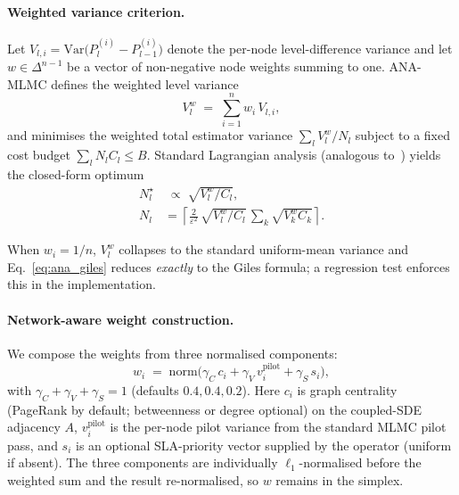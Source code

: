 \documentclass{ieeeaccess}
\begin{document}
\paragraph{Weighted variance criterion.}
Let $V_{l,i} = \mathrm{Var}\bigl(P_l^{(i)} - P_{l-1}^{(i)}\bigr)$ denote the per-node
level-difference variance and let $w \in \Delta^{n-1}$ be a vector of non-negative node weights
summing to one. ANA-MLMC defines the weighted level variance
\begin{equation}
    V_l^{w} \;=\; \sum_{i=1}^{n} w_i\, V_{l,i},
    \label{eq:ana_var}
\end{equation}
and minimises the weighted total estimator variance $\sum_l V_l^{w}/N_l$ subject to a fixed cost
budget $\sum_l N_l C_l \le B$. Standard Lagrangian analysis (analogous
to~\cite{giles2015multilevel}) yields the closed-form optimum
\begin{align}
    N_l^{\star} &\;\propto\; \sqrt{V_l^{w}/C_l}, \nonumber \\
    N_l &= \left\lceil \tfrac{2}{\varepsilon^{2}}\,
    \sqrt{V_l^{w}/C_l}\, \sum_k \sqrt{V_k^{w} C_k} \right\rceil .
    \label{eq:ana_giles}
\end{align}
\begin{sloppypar}
When $w_i = 1/n$, $V_l^{w}$ collapses to the standard uniform-mean variance and
Eq.~\eqref{eq:ana_giles} reduces \emph{exactly} to the Giles formula; a regression test
enforces this in the implementation.
\end{sloppypar}

\paragraph{Network-aware weight construction.}
We compose the weights from three normalised components:
\begin{equation}
    w_i \;=\; \mathrm{norm}\bigl(\gamma_C\, c_i
                + \gamma_V\, v_i^{\text{pilot}}
                + \gamma_S\, s_i\bigr),
    \label{eq:ana_weights}
\end{equation}
with $\gamma_C+\gamma_V+\gamma_S=1$ (defaults $0.4, 0.4, 0.2$). Here $c_i$ is graph centrality
(PageRank by default; betweenness or degree optional) on the coupled-SDE adjacency $A$,
$v_i^{\text{pilot}}$ is the per-node pilot variance from the standard MLMC pilot pass, and $s_i$
is an optional SLA-priority vector supplied by the operator (uniform if absent). The three
components are individually $\ell_1$-normalised before the weighted sum and the result
re-normalised, so $w$ remains in the simplex.
\end{document}
